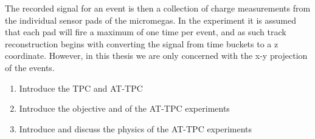 The recorded signal for an event is then a collection of charge measurements from the individual sensor pads of the micromegas. In the experiment it is assumed that each pad will fire a maximum of one time per event, and as such track reconstruction begins with converting the signal from time buckets to a z coordinate. However, in this thesis we are only concerned with the x-y projection of the events. 



\begin{enumerate}
	\item Introduce the TPC and AT-TPC
	\item Introduce the objective and of the AT-TPC experiments
	\item Introduce and discuss the physics of the AT-TPC experiments 
\end{enumerate}